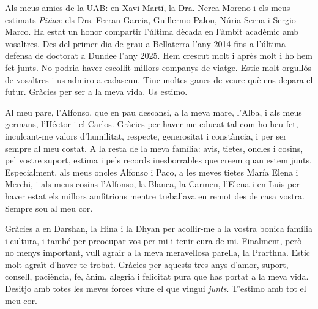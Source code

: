 Als meus amics de la UAB: en Xavi Martí, la Dra. Nerea Moreno i els meus estimats \textit{Piñas}: els Drs. Ferran Garcia, Guillermo Palou, Núria Serna i Sergio Marco. Ha estat un honor compartir l'última dècada en l'àmbit acadèmic amb vosaltres. Des del primer dia de grau a Bellaterra l'any 2014 fins a l'última defensa de doctorat a Dundee l'any 2025. Hem crescut molt i après molt i ho hem fet junts. No podria haver escollit millors companys de viatge. Estic molt orgullós de vosaltres i us admiro a cadascun. Tinc moltes ganes de veure què ens depara el futur. Gràcies per ser a la meva vida. Us estimo.

Al meu pare, l'Alfonso, que en pau descansi, a la meva mare, l'Alba, i als meus germans, l'Héctor i el Carlos. Gràcies per haver-me educat tal com ho heu fet, inculcant-me valors d'humilitat, respecte, generositat i constància, i per ser sempre al meu costat. A la resta de la meva família: avis, tietes, oncles i cosins, pel vostre suport, estima i pels records inesborrables que creem quan estem junts. Especialment, als meus oncles Alfonso i Paco, a les meves tietes María Elena i Merchi, i als meus cosins l'Alfonso, la Blanca, la Carmen, l'Elena i en Luis per haver estat els millors amfitrions mentre treballava en remot des de casa vostra. Sempre sou al meu cor.

Gràcies a en Darshan, la Hina i la Dhyan per acollir-me a la vostra bonica família i cultura, i també per preocupar-vos per mi i tenir cura de mi. Finalment, però no menys important, vull agrair a la meva meravellosa parella, la Prarthna. Estic molt agraït d'haver-te trobat. Gràcies per aquests tres anys d'amor, suport, consell, paciència, fe, ànim, alegria i felicitat pura que has portat a la meva vida. Desitjo amb totes les meves forces viure el que vingui \textit{junts}. T'estimo amb tot el meu cor.